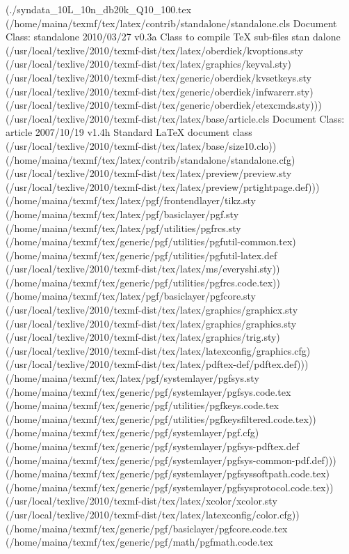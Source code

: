 \begin{center}
\begin{center}
{{(./syndata_10L_10n_db20k_Q10_100.tex
(/home/maina/texmf/tex/latex/contrib/standalone/standalone.cls
Document Class: standalone 2010/03/27 v0.3a Class to compile TeX sub-files stan
dalone
(/usr/local/texlive/2010/texmf-dist/tex/latex/oberdiek/kvoptions.sty
(/usr/local/texlive/2010/texmf-dist/tex/latex/graphics/keyval.sty)
(/usr/local/texlive/2010/texmf-dist/tex/generic/oberdiek/kvsetkeys.sty
(/usr/local/texlive/2010/texmf-dist/tex/generic/oberdiek/infwarerr.sty)
(/usr/local/texlive/2010/texmf-dist/tex/generic/oberdiek/etexcmds.sty)))
(/usr/local/texlive/2010/texmf-dist/tex/latex/base/article.cls
Document Class: article 2007/10/19 v1.4h Standard LaTeX document class
(/usr/local/texlive/2010/texmf-dist/tex/latex/base/size10.clo))
(/home/maina/texmf/tex/latex/contrib/standalone/standalone.cfg)
(/usr/local/texlive/2010/texmf-dist/tex/latex/preview/preview.sty
(/usr/local/texlive/2010/texmf-dist/tex/latex/preview/prtightpage.def)))
(/home/maina/texmf/tex/latex/pgf/frontendlayer/tikz.sty
(/home/maina/texmf/tex/latex/pgf/basiclayer/pgf.sty
(/home/maina/texmf/tex/latex/pgf/utilities/pgfrcs.sty
(/home/maina/texmf/tex/generic/pgf/utilities/pgfutil-common.tex)
(/home/maina/texmf/tex/generic/pgf/utilities/pgfutil-latex.def
(/usr/local/texlive/2010/texmf-dist/tex/latex/ms/everyshi.sty))
(/home/maina/texmf/tex/generic/pgf/utilities/pgfrcs.code.tex))
(/home/maina/texmf/tex/latex/pgf/basiclayer/pgfcore.sty
(/usr/local/texlive/2010/texmf-dist/tex/latex/graphics/graphicx.sty
(/usr/local/texlive/2010/texmf-dist/tex/latex/graphics/graphics.sty
(/usr/local/texlive/2010/texmf-dist/tex/latex/graphics/trig.sty)
(/usr/local/texlive/2010/texmf-dist/tex/latex/latexconfig/graphics.cfg)
(/usr/local/texlive/2010/texmf-dist/tex/latex/pdftex-def/pdftex.def)))
(/home/maina/texmf/tex/latex/pgf/systemlayer/pgfsys.sty
(/home/maina/texmf/tex/generic/pgf/systemlayer/pgfsys.code.tex
(/home/maina/texmf/tex/generic/pgf/utilities/pgfkeys.code.tex
(/home/maina/texmf/tex/generic/pgf/utilities/pgfkeysfiltered.code.tex))
(/home/maina/texmf/tex/generic/pgf/systemlayer/pgf.cfg)
(/home/maina/texmf/tex/generic/pgf/systemlayer/pgfsys-pdftex.def
(/home/maina/texmf/tex/generic/pgf/systemlayer/pgfsys-common-pdf.def)))
(/home/maina/texmf/tex/generic/pgf/systemlayer/pgfsyssoftpath.code.tex)
(/home/maina/texmf/tex/generic/pgf/systemlayer/pgfsysprotocol.code.tex))
(/usr/local/texlive/2010/texmf-dist/tex/latex/xcolor/xcolor.sty
(/usr/local/texlive/2010/texmf-dist/tex/latex/latexconfig/color.cfg))
(/home/maina/texmf/tex/generic/pgf/basiclayer/pgfcore.code.tex
(/home/maina/texmf/tex/generic/pgf/math/pgfmath.code.tex
}}
\end{center}
\end{center}
